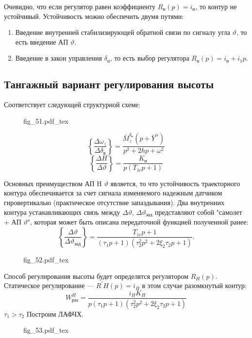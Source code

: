\documentclass{article}
\newcommand{\incfig}[1]{
    {#1.pdf_tex}
}
\begin{document}
Очевидно, что если регулятор равен коэффициенту $R_\text{н}(p)  = i_\text{н}$,
то контур не устойчивый.
Устойчивость можно обеспечить двумя путями:

\begin{enumerate}
	\item Введение внутренней стабилизирующей обратной связи по сигналу угла
	      $\vartheta$, то есть введение АП $\vartheta$.
	\item Введение в закон управления $\delta_\text{н}$, то есть выбор
	      регулятора $R_\text{н}(p) = i_\text{н} + i_1p$.
\end{enumerate}

\subsection{Тангажный вариант регулирования высоты}
Соответствует следующей структурной схеме:

\begin{figure}[H]
	\centering
	\incfig{fig_51}
	\label{fig:fig_51}
\end{figure}

\[
	\left\{\frac{\Delta \omega_z}{\Delta \delta_\text{в}} \right\} =
	\frac{\bar{M}_z^{\delta_\text{в}}(p + \bar{Y}^\alpha)}{p^2 + 2hp +
	\omega^2}
\]
\[
	\left\{ \frac{\Delta H}{\Delta \vartheta} \right\} =
	\frac{K_\text{н}}{p(T_{1c}p +1)}
\]

Основных преимуществом АП H $\vartheta$ является, то что устойчивость
траекторного контура обеспечивается за счет сигнала изменяемого надежным
датчиком гировертикалью (практическое отсутствие запаздывания). Два внутренних
контура устанавливающих связь между $\Delta \vartheta$, $\Delta
	\vartheta_\text{зад}$ представляют собой "самолет + АП $\vartheta$", которая
может быть описана передаточной функцией полученной ранее:
\[
	\left\{\frac{\Delta \vartheta}{\Delta \vartheta_\text{зад}} \right\}
	=\frac{T_{1c}p + 1}{(\tau_1 p + 1) (\tau_2^2p^2 + 2 \xi_2 \tau_2 p + 1)}.
\]
\begin{figure}[H]
	\centering
	\incfig{fig_52}
	\label{fig:fig_52}
\end{figure}
Способ регулирования высоты будет определятся регулятором $R_H(p)$.
Статическое регулирование --- $R^{'}H(p) = i_H$ в этом случае разомкнутый
контур:
\[
	W_\text{раз}^H =\frac{i_H K_H}{p(\tau_1 p + 1)(\tau_2^2 p^2 + 2 \xi_2
		\tau_2 p + 1)}
\]
$\tau_1 > \tau_2$
Построим ЛАФЧХ.

\begin{figure}[H]
	\centering
	\incfig{fig_53}
	\label{fig:fig_53}
\end{figure}
\end{document}
